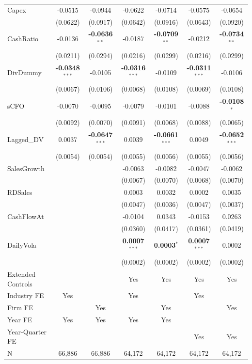 \begin{landscape}
\begin{table}[H]
\begin{tabular}{lcccccc}
Capex & -0.0515 & -0.0944 & -0.0622 & -0.0714 & -0.0575 & -0.0654 \\
 & (0.0622) & (0.0917) & (0.0642) & (0.0916) & (0.0643) & (0.0920) \\
CashRatio & -0.0136 & \textbf{-0.0636}$^{**}$ & -0.0187 & \textbf{-0.0709}$^{**}$ & -0.0212 & \textbf{-0.0734}$^{**}$ \\
 & (0.0211) & (0.0294) & (0.0216) & (0.0299) & (0.0216) & (0.0299) \\
DivDummy & \textbf{-0.0348}$^{***}$ & -0.0105 & \textbf{-0.0316}$^{***}$ & -0.0109 & \textbf{-0.0311}$^{***}$ & -0.0106 \\
 & (0.0067) & (0.0106) & (0.0068) & (0.0108) & (0.0069) & (0.0108) \\
sCFO & -0.0070 & -0.0095 & -0.0079 & -0.0101 & -0.0088 & \textbf{-0.0108}$^{*}$ \\
 & (0.0092) & (0.0070) & (0.0091) & (0.0068) & (0.0088) & (0.0065) \\
Lagged\_DV & 0.0037 & \textbf{-0.0647}$^{***}$ & 0.0039 & \textbf{-0.0661}$^{***}$ & 0.0049 & \textbf{-0.0652}$^{***}$ \\
 & (0.0054) & (0.0054) & (0.0055) & (0.0056) & (0.0055) & (0.0056) \\
SalesGrowth &  &  & -0.0063 & -0.0082 & -0.0047 & -0.0062 \\
 &  &  & (0.0067) & (0.0070) & (0.0068) & (0.0070) \\
RDSales &  &  & 0.0003 & 0.0032 & 0.0002 & 0.0035 \\
 &  &  & (0.0047) & (0.0036) & (0.0047) & (0.0037) \\
CashFlowAt &  &  & -0.0104 & 0.0343 & -0.0153 & 0.0263 \\
 &  &  & (0.0360) & (0.0417) & (0.0361) & (0.0419) \\
DailyVola &  &  & \textbf{0.0007}$^{***}$ & \textbf{0.0003}$^{*}$ & \textbf{0.0007}$^{***}$ & 0.0002 \\
 &  &  & (0.0002) & (0.0002) & (0.0002) & (0.0002) \\
\midrule
Extended Controls &  &  & Yes & Yes & Yes & Yes \\
Industry FE & Yes &  & Yes &  & Yes &  \\
Firm FE &  & Yes &  & Yes &  & Yes \\
Year FE & Yes & Yes & Yes & Yes &  &  \\
Year-Quarter FE &  &  &  &  & Yes & Yes \\
\midrule
N & 66,886 & 66,886 & 64,172 & 64,172 & 64,172 & 64,172 \\

\end{tabular}
\end{table}
\end{landscape}
